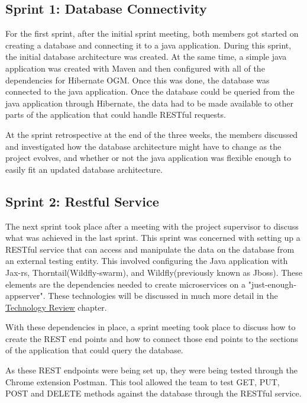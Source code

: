 \subsection{Sprint 1: Database Connectivity}
\label{sec:MethodologySprint1}
For the first sprint, after the initial sprint meeting, both members got started on creating a database and connecting it to a java application. During this sprint, the initial database architecture was created. At the same time, a simple java application was created with Maven and then configured with all of the dependencies for Hibernate OGM. Once this was done, the database was connected to the java application. Once the database could be queried from the java application through Hibernate, the data had to be made available to other parts of the application that could handle RESTful requests. 

\bigskip

At the sprint retrospective at the end of the three weeks, the members discussed and investigated how the database architecture might have to change as the project evolves, and whether or not the java application was flexible enough to easily fit an updated database architecture.
\subsection{Sprint 2: Restful Service}
\label{sec:MethodologySprint2}
The next sprint took place after a meeting with the project supervisor to discuss what was achieved in the last sprint. This sprint was concerned with setting up a RESTful service that can access and manipulate the data on the database from an external testing entity. This involved configuring the Java application with Jax-rs, Thorntail(Wildfly-swarm),
and Wildfly(previously known as Jboss). These elements are the dependencies needed to create microservices on a 
"just-enough-appserver". These technologies will be discussed in much more detail in the  \hyperref[sec:TechnologyReviewWildfly]{\underline{Technology Review}}
\bigskip chapter.

With these dependencies in place, a sprint meeting took place to discuss how to create the REST end points and how to connect those end points to the sections of the application that could query the database. 

As these REST endpoints were being set up, they were being tested through the Chrome extension Postman. This tool allowed the team to test GET, PUT, POST and DELETE methods against the database through the RESTful service.
